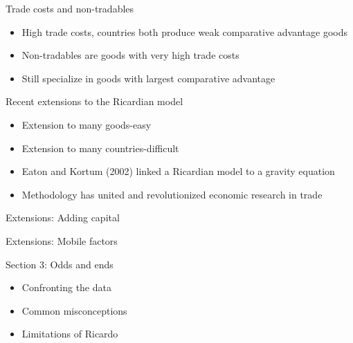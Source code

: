 \documentclass[ignorenonframetext,]{beamer}
\begin{document}
\begin{frame}{Trade costs and non-tradables}

    \begin{itemize}
        \item High trade costs, countries both produce weak comparative advantage goods
        \item Non-tradables are goods with very high trade costs 
        \item Still specialize in goods with largest comparative advantage
    \end{itemize}

\end{frame}

\begin{frame}{Recent extensions to the Ricardian model}

    \begin{itemize}
        \item Extension to many goods-easy
        \item Extension to many countries-difficult
        \item Eaton and Kortum (2002) linked a Ricardian model to a gravity equation 
        \item Methodology has united and revolutionized economic research in trade
    \end{itemize}

\end{frame}

\begin{frame}{Extensions: Adding capital}

\end{frame}

\begin{frame}{Extensions: Mobile factors}

\end{frame}

\begin{frame}
    Section 3: Odds and ends 
    \begin{itemize}
        \item Confronting the data
        \item Common misconceptions
        \item Limitations of Ricardo
    \end{itemize}
\end{frame}
\end{document}
